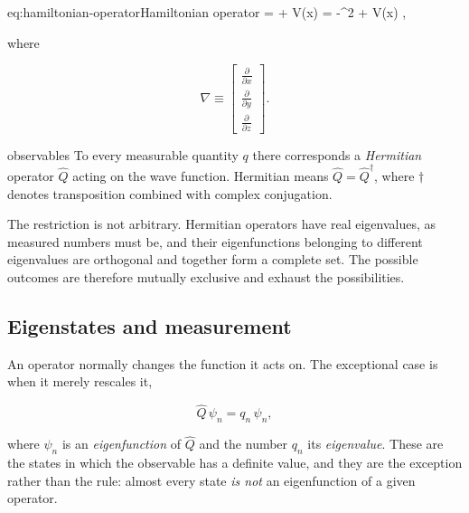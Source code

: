         \begin{keyeq}{eq:hamiltonian-operator}{Hamiltonian operator}
             =  + V(x) = -\nabla^{2} + V(x) ,
        \end{keyeq}

        where

        \begin{equation}\label{eq:nabla}
        \nabla \equiv
            \begin{bmatrix}
                \frac{\partial}{\partial x} \\[1ex] \frac{\partial}{\partial y} \\[1ex] \frac{\partial}{\partial z}
            \end{bmatrix}.
        \end{equation}

        \begin{postulate}{observables}
            \label{post:observables}
            To every measurable quantity $q$ there corresponds a \emph{Hermitian} operator $\hat{Q}$ acting on the wave function. Hermitian means $\hat{Q} = \hat{Q}^{\dag}$, where $\dag$ denotes transposition combined with complex conjugation.
        \end{postulate}

        The restriction is not arbitrary. Hermitian operators have real eigenvalues, as measured numbers must be, and their eigenfunctions belonging to different eigenvalues are orthogonal and together form a complete set. The possible outcomes are therefore mutually exclusive and exhaust the possibilities.

    \subsection{Eigenstates and measurement}

        An operator normally changes the function it acts on. The exceptional case is when it merely rescales it,

        \begin{equation}\label{eq:eigenvalue}
            \hat{Q}\,\psi_{n} = q_{n}\,\psi_{n},
        \end{equation}

        where $\psi_{n}$ is an \emph{eigenfunction} of $\hat{Q}$ and the number $q_{n}$ its \emph{eigenvalue}. These are the states in which the observable has a definite value, and they are the exception rather than the rule: almost every state \emph{is not} an eigenfunction of a given operator.

